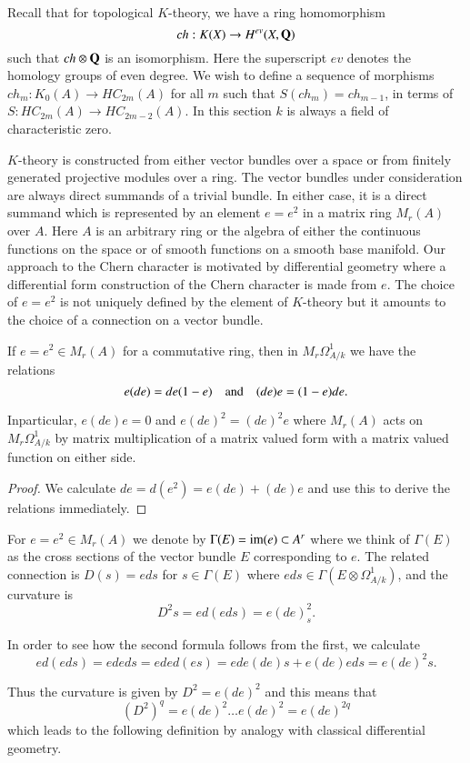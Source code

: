 Recall that for topological $K$-theory, we have a ring homomorphism
$$
ch:K(X)\to H^{ev}(X,\mathbf{Q})
$$
such that $ch\otimes\mathbf{Q}$ is an isomorphism. Here the superscript $ev$
denotes the homology groups of even degree. We wish to define a
sequence of morphisms $ch_{m}:K_{0}(A)\to HC_{2m}(A)$ for all $m$ such
that $S(ch_{m})=ch_{m-1}$, in terms of $S:HC_{2m}(A)\to
HC_{2m-2}(A)$. In this section $k$ is always a field of characteristic
zero. 

\begin{remark}\label{chap6-rem6.1}
$K$-theory is constructed from either vector bundles over a space or
  from finitely generated projective modules over a ring. The vector
  bundles under consideration are always direct summands of a trivial
  bundle. In either case, it is a direct summand which is represented
  by an element $e=e^{2}$ in a matrix ring $M_{r}(A)$ over $A$. Here
  $A$ is an arbitrary ring or the algebra of either the continuous
  functions on the space or of smooth functions on a smooth base
  manifold. Our approach to the Chern character is motivated by
  differential geometry where a differential form construction of the
  Chern character is made from $e$. The choice of $e=e^{2}$ is not
  uniquely defined by the element of $K$-theory but it amounts to the
  choice of a connection on a vector bundle.
\end{remark}

\begin{proposition}\label{chap6-prop6.2}
If $e=e^{2}\in M_{r}(A)$ for a commutative ring, then in
$M_{r}\Omega^{1}_{A/k}$ we have the relations
$$
e(de)=de(1-e)\quad\text{and}\quad (de)e=(1-e)de.
$$

In\pageoriginale particular, $e(de)e=0$ and $e(de)^{2}=(de)^{2}e$
where $M_{r}(A)$ acts on $M_{r}\Omega^{1}_{A/k}$ by matrix
multiplication of a matrix valued form with a matrix valued function
on either side.
\end{proposition}

\begin{proof}
We calculate $de=d(e^{2})=e(de)+(de)e$ and use this to derive the
relations immediately.
\end{proof}

\begin{remark}\label{chap6-rem6.3}
For $e=e^{2}\in M_{r}(A)$ we denote by $\Gamma(E)=\operatorname{im}(e)\subset
A^{r}$ where we think of $\Gamma(E)$ as the cross sections of the
vector bundle $E$ corresponding to $e$. The related connection is
$D(s)=eds$ for $s\in \Gamma(E)$ where $eds\in \Gamma(E\otimes
\Omega^{1}_{A/k})$, and the curvature is
$$
D^{2}s=ed(eds)=e(de)^{2}_{s}.
$$

In order to see how the second formula follows from the first, we
calculate
$$
ed(eds)=ededs=eded(es)=ede(de)s+e(de)eds=e(de)^{2}s.
$$

Thus the curvature is given by $D^{2}=e(de)^{2}$ and this means that
$$
(D^{2})^{q}=e(de)^{2}\ldots e(de)^{2}=e(de)^{2q}
$$
which leads to the following definition by analogy with classical
differential geometry.
\end{remark}

